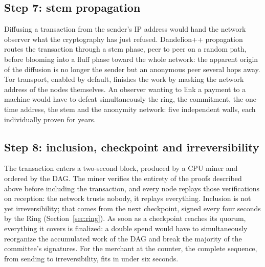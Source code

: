 \subsection{Step 7: stem propagation}

Diffusing a transaction from the sender's IP address would hand the
network observer what the cryptography has just refused. Dandelion++
propagation routes the transaction through a stem phase, peer to peer on
a random path, before blooming into a fluff phase toward the whole
network: the apparent origin of the diffusion is no longer the sender but
an anonymous peer several hops away. Tor transport, enabled by default,
finishes the work by masking the network address of the nodes themselves.
An observer wanting to link a payment to a machine would have to defeat
simultaneously the ring, the commitment, the one-time address, the stem
and the anonymity network: five independent walls, each individually
proven for years.

\subsection{Step 8: inclusion, checkpoint and irreversibility}

The transaction enters a two-second block, produced by a CPU miner and
ordered by the DAG. The miner verifies the entirety of the proofs
described above before including the transaction, and every node replays
those verifications on reception: the network trusts nobody, it replays
everything. Inclusion is not yet irreversibility; that comes from the next
checkpoint, signed every four seconds by the Ring
(Section~\ref{sec:ring}). As soon as a checkpoint reaches its quorum,
everything it covers is finalized: a double spend would have to
simultaneously reorganize the accumulated work of the DAG and break the
majority of the committee's signatures. For the merchant at the counter,
the complete sequence, from sending to irreversibility, fits in under six
seconds.

